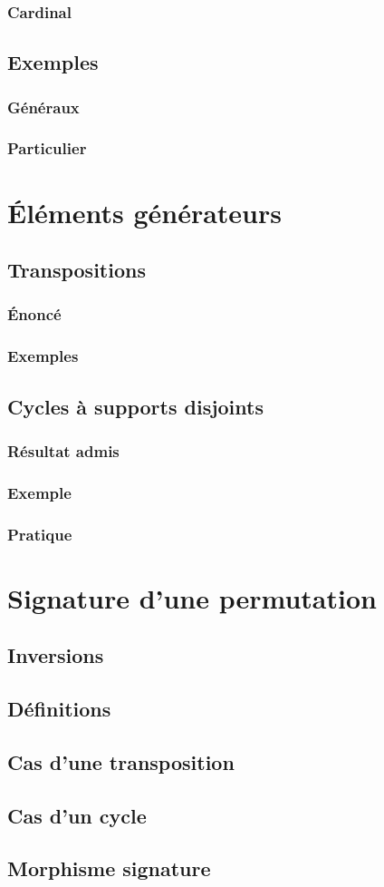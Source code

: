 \documentclass[12pt,a4paper,french]{book}
\begin{document}
			\subsubsection{Cardinal}
		\subsection{Exemples}
			\subsubsection{Généraux}
			\subsubsection{Particulier}
	\section{Éléments générateurs}
		\subsection{Transpositions}
			\subsubsection{Énoncé}
			\subsubsection{Exemples}
		\subsection{Cycles à supports disjoints}
			\subsubsection{Résultat admis}
			\subsubsection{Exemple}
			\subsubsection{Pratique}
	\section{Signature d'une permutation}
		\subsection{Inversions}
		\subsection{Définitions}
		\subsection{Cas d'une transposition}
		\subsection{Cas d'un cycle}
		\subsection{Morphisme signature}
			
\end{document}
